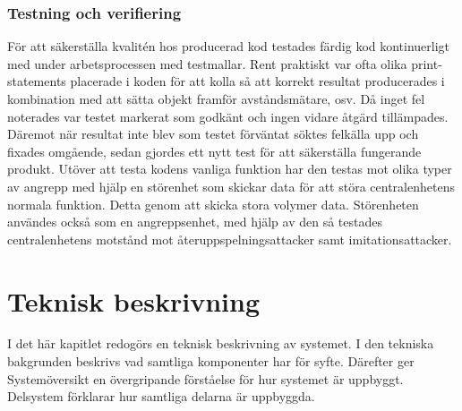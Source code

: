 \documentclass{article}
\begin{document}
\subsubsection{Testning och verifiering}
För att säkerställa kvalitén hos producerad kod testades färdig kod kontinuerligt med under arbetsprocessen med testmallar.
Rent praktiskt var ofta olika print-statements placerade i koden för att kolla så att korrekt resultat producerades i kombination med att sätta objekt framför avståndsmätare, osv.
Då inget fel noterades var testet markerat som godkänt och ingen vidare åtgärd tillämpades. 
Däremot när resultat inte blev som testet förväntat söktes felkälla upp och fixades omgående, sedan gjordes ett nytt test för att säkerställa fungerande produkt. 
Utöver att testa kodens vanliga funktion har den testas mot olika typer av angrepp med hjälp en störenhet som skickar data för att störa centralenhetens normala funktion. 
Detta genom att  skicka stora volymer data. 
Störenheten användes också som en angreppsenhet, med hjälp av den så testades centralenhetens motstånd mot återuppspelningsattacker samt imitationsattacker.

\section{Teknisk beskrivning}
I det här kapitlet redogörs en teknisk beskrivning av systemet. 
I den tekniska bakgrunden beskrivs vad samtliga komponenter har för syfte. Därefter ger Systemöversikt en övergripande förståelse för hur systemet är uppbyggt. 
Delsystem förklarar hur samtliga delarna är uppbyggda.
\end{document}
